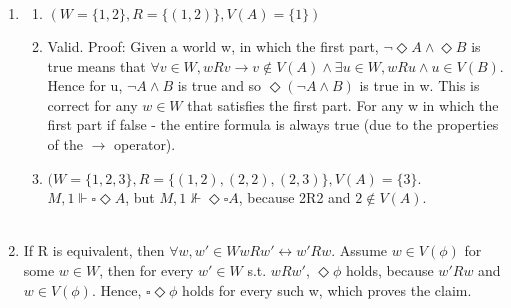 \documentclass{article}
\newcommand{\then}{\longrightarrow}
\renewcommand{\iff}{\longleftrightarrow}
\begin{document}
\begin{enumerate}
	\item { }
	\begin{enumerate}
		\item $(W=\{1,2\}, R=\{(1,2)\}, V(A)=\{1\})$
		\item Valid. Proof: Given a world w, in which the first part, $\lnot\Diamond A \land \Diamond B$ is true means that $\forall v \in W, wRv \then v \notin V(A) \land \exists u \in W, wRu \land u \in V(B)$. Hence for u, $\lnot A \land B$ is true and so $\Diamond (\lnot A \land B)$ is true in w. This is correct for any $w \in W$ that satisfies the first part. For any w in which the first part if false - the entire formula is always true (due to the properties of the $\then$ operator).
		\item $(W=\{1,2,3\}, R=\{(1,2),(2,2),(2,3)\}, V(A)=\{3\}$.\\
			$M,1\Vdash\square\Diamond A$, but $M,1\nVdash\Diamond\square A$, because 2R2 and $2 \notin V(A)$.\\\\
	\end{enumerate}


        \item If R is equivalent, then $\forall w,w' \in W wRw' \iff w'Rw$. Assume $w \in V(\phi)$ for some $w \in W$, then for every $w' \in W$ s.t. $wRw'$, $\Diamond\phi$ holds, because $w'Rw$ and $w \in V(\phi)$. Hence, $\square\Diamond\phi$ holds for every such w, which proves the claim.
\end{enumerate}
\end{document}
